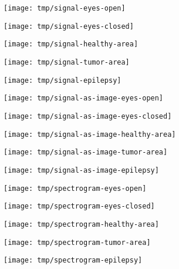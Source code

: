 \documentclass[conference]{IEEEtran}
\begin{document}
\begin{figure*}[!t]
	\centering
	\begin{subfigure}{0.19\linewidth}
		\centering
		\texttt{[image: tmp/signal-eyes-open]}
	\end{subfigure}
	\begin{subfigure}{0.19\linewidth}
		\centering
		\texttt{[image: tmp/signal-eyes-closed]}
	\end{subfigure}
	\begin{subfigure}{0.19\linewidth}
		\centering
		\texttt{[image: tmp/signal-healthy-area]}
	\end{subfigure}
	\begin{subfigure}{0.19\linewidth}
		\centering
		\texttt{[image: tmp/signal-tumor-area]}
	\end{subfigure}
	\begin{subfigure}{0.19\linewidth}
		\centering
		\texttt{[image: tmp/signal-epilepsy]}
	\end{subfigure}

	\begin{subfigure}{0.19\linewidth}
		\centering
		\texttt{[image: tmp/signal-as-image-eyes-open]}
	\end{subfigure}
	\begin{subfigure}{0.19\linewidth}
		\centering
		\texttt{[image: tmp/signal-as-image-eyes-closed]}
	\end{subfigure}
	\begin{subfigure}{0.19\linewidth}
		\centering
		\texttt{[image: tmp/signal-as-image-healthy-area]}
	\end{subfigure}
	\begin{subfigure}{0.19\linewidth}
		\centering
		\texttt{[image: tmp/signal-as-image-tumor-area]}
	\end{subfigure}
	\begin{subfigure}{0.19\linewidth}
		\centering
		\texttt{[image: tmp/signal-as-image-epilepsy]}
	\end{subfigure}

	\begin{subfigure}{0.19\linewidth}
		\centering
		\texttt{[image: tmp/spectrogram-eyes-open]}
	\end{subfigure}
	\begin{subfigure}{0.19\linewidth}
		\centering
		\texttt{[image: tmp/spectrogram-eyes-closed]}
	\end{subfigure}
	\begin{subfigure}{0.19\linewidth}
		\centering
		\texttt{[image: tmp/spectrogram-healthy-area]}
	\end{subfigure}
	\begin{subfigure}{0.19\linewidth}
		\centering
		\texttt{[image: tmp/spectrogram-tumor-area]}
	\end{subfigure}
	\begin{subfigure}{0.19\linewidth}
		\centering
		\texttt{[image: tmp/spectrogram-epilepsy]}
	\end{subfigure}


\end{figure*}
\end{document}
